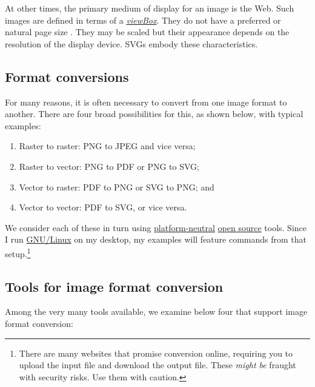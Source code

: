 \documentclass[
  11pt,
  british,
  a4paper,
]{article}
\providecommand{\tightlist}{%
  \setlength{\itemsep}{0pt}\setlength{\parskip}{0pt}}
\begin{document}
At other times, the primary medium of display for an image is the Web.
Such images are defined in terms of a
\href{https://developer.mozilla.org/en-US/docs/Web/SVG/Attribute/viewBox}{\emph{viewBox}}.
They do not have a preferred or natural page size . They may be scaled
but their appearance depends on the resolution of the display device.
SVGs embody these characteristics.

\hypertarget{format-conversions}{%
\subsection{Format conversions}\label{format-conversions}}

For many reasons, it is often necessary to convert from one image format
to another. There are four broad possibilities for this, as shown below,
with typical examples:

\begin{enumerate}
\tightlist
\item
  Raster to raster: PNG to JPEG and vice versa;
\item
  Raster to vector: PNG to PDF or PNG to SVG;
\item
  Vector to raster: PDF to PNG or SVG to PNG; and
\item
  Vector to vector: PDF to SVG, or vice versa.
\end{enumerate}

We consider each of these in turn using
\href{https://itlaw.wikia.org/wiki/Platform_neutral}{platform-neutral}
\href{https://opensource.com/resources/what-open-source}{open source}
tools. Since I run
\href{https://en.wikipedia.org/wiki/GNU/Linux_naming_controversy}{GNU/Linux}
on my desktop, my examples will feature commands from that
setup.\footnote{There are many websites that promise conversion online,
  requiring you to upload the input file and download the output file.
  These \emph{might be} fraught with security risks. Use them with
  caution.}

\hypertarget{tools-for-image-format-conversion}{%
\subsection{Tools for image format
conversion}\label{tools-for-image-format-conversion}}

Among the very many tools available, we examine below four that support
image format conversion:
\end{document}
